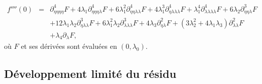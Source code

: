 \documentclass{article}
\begin{document}
\begin{eqnarray}
  f'''' (0) & = & \partial_{\eta  \eta  \eta  \eta}^4
  F + 4 \lambda_1 \partial_{\eta  \eta  \eta
  \lambda}^4 F + 6 \lambda_1^2 \partial_{\eta  \eta  \lambda
   \lambda}^4 F + 4 \lambda_1^3 \partial_{\eta  \lambda
   \lambda  \lambda}^4 F + \lambda_1^4 \partial_{\lambda
   \lambda  \lambda  \lambda}^4 F + 6 \lambda_2
  \partial_{\eta  \eta  \lambda}^3 F \nonumber\\
  &  & + 12 \lambda_1 \lambda_2 \partial_{\eta  \lambda
  \lambda}^3 F + 6 \lambda_1^2 \lambda_2 \partial_{\lambda  \lambda
   \lambda}^3 F + 4 \lambda_3 \partial_{\eta  \lambda}^2 F +
  (3 \lambda_2^2 + 4 \lambda_1 \lambda_3) \partial_{\lambda
  \lambda}^2 F \nonumber\\
  &  & + \lambda_4 \partial_{\lambda} F,
\end{eqnarray}
où $F$ et ses dérivées sont évaluées en $(0, \lambda_0)$.

\subsection{Développement limité du
résidu}\label{sec20211112182000}
\end{document}

